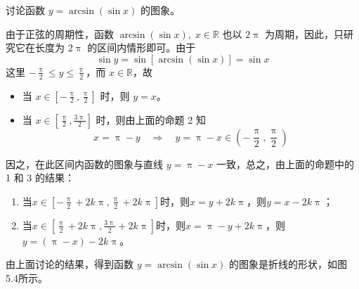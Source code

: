 \begin{example}
  讨论函数 $y=\arcsin(\sin x)$ 的图象。
\end{example}

\begin{solution}
  由于正弦的周期性，函数 $\arcsin(\sin x),\; x\in\mathbb{R}$ 也以 $2\uppi$ 为周期，因此，只研究它在长度为 $2\uppi$ 的区间内情形即可。由于
  \[\sin y=\sin[\arcsin(\sin x)]=\sin x\]
  这里 $-\frac{\uppi}{2}\leqslant y\leqslant \frac{\uppi}{2}$，而 $x\in\mathbb{R}$，故
  \begin{itemize}
    \item 当 $x\in\left[-\frac{\uppi}{2},\frac{\uppi}{2}\right]$ 时，则 $y=x$。
    \item 当 $x\in\left[\frac{\uppi}{2},\frac{3\uppi}{2}\right]$ 时，则由上面的命题 2 知
    \[x=\uppi-y\quad \Rightarrow\quad y=\uppi-x\in \left(-\frac{\uppi}{2},\frac{\uppi}{2}\right)\]
  \end{itemize}
因之，在此区间内函数的图象与直线 $y=\uppi-x$ 一致，总之，由上面的命题中的 1 和 3 的结果：
\begin{enumerate}
  \item 当$x\in \left[-\frac{\uppi}{2}+2k\uppi,\frac{\uppi}{2}+2k\uppi\right]$时，则$x=y+2k\uppi$，则$y=x-2k\uppi$；
  \item 当$x\in \left[\frac{\uppi}{2}+2k\uppi,\frac{3\uppi}{2}+2k\uppi\right]$时，则$x=\uppi-y+2k\uppi$，则$y=(\uppi-x)-2k\uppi$。
\end{enumerate}
由上面讨论的结果，得到函数 $y= \arcsin(\sin x)$ 的图象是折线的形状，如图 5.4所示。
\begin{figure}[htp]
    \centering
{}
    \caption{}
\end{figure}
\end{solution}



